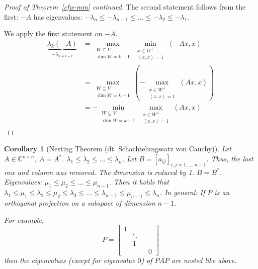 \documentclass{article}
\newtheorem{corollary}{Corollary}  \numberwithin{corollary}{section}
\newcommand{\angel}[1]{\left\langle#1\right\rangle}
\begin{document}
\begin{proof}[Proof of Theorem~\ref{cfw-mm} continued]
  The second statement follows from the first:
  $-A$ has eigenvalues: $-\lambda_n \leq -\lambda_{n-1} \leq \dots \leq -\lambda_{2} \leq -\lambda_1$.

  We apply the first statement on $-A$.
  \begin{align*}
    \underbrace{\lambda_k(-A)}_{-\lambda_{n+1-k}} &= \max_{\substack{W \subseteq V \\ \dim{W} = k-1}} \min_{\substack{x \in W^\bot \\ \angel{x, x} = 1}} \angel{-Ax, x} \\
      &= \max_{\substack{W\subseteq V \\ \dim{W} = k-1}} \left(- \max_{\substack{x \in W^\bot \\ \angel{x, x} = 1}} \angel{Ax, x}\right) \\
      &= -\min_{\substack{W \subseteq V \\ \dim{W} = k-1}} \max_{\substack{x \in W^\bot \\ \angel{x, x} = 1}} \angel{Ax, x}
  \end{align*}
\end{proof}

\begin{corollary}[Nesting Theorem (dt. \foreignlanguage{german}{Schachtelungssatz von Cauchy})] %
  Let $A \in \mathbb C^{n \times n}$, $A = A^*$. $\lambda_1 \leq \lambda_2 \leq \dots \leq \lambda_n$.
  Let $B = [a_{ij}]_{i,j=1,\dots,n-1}$. Thus, the last row and column was removed. The dimension is reduced by 1.
  $B = B^*$.
  Eigenvalues: $\mu_1 \leq \mu_2 \leq \dots \leq \mu_{n-1}$.
  Then it holds that $\lambda_1 \leq \mu_1 \leq \lambda_2 \leq \mu_2 \leq \lambda_3 \leq \dots \leq \lambda_{n-1} \leq \mu_{n-1} \leq \lambda_n$.
  In general: If $P$ is an orthogonal projection on a subspace of dimension $n-1$.

  For example,
  \[ P = \begin{bmatrix} 1 & & & \\ & \ddots & & \\ & 1 & & \\ & & & 0 \end{bmatrix} \]
  then the eigenvalues (except for eigenvalue $0$) of $PAP$ are nested like above.
\end{corollary}
\end{document}
